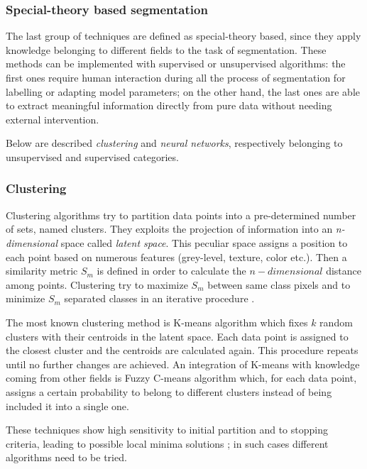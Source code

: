 \documentclass[../main.tex]{subfiles}
\begin{document}
\subsubsection{\large {Special-theory based segmentation}}

The last group of techniques are defined as special-theory based, since they apply knowledge belonging to different fields to the task of segmentation. 
These methods can be implemented with supervised or unsupervised algorithms: the first ones require human interaction during all the process of segmentation for labelling or adapting model parameters; on the other hand, the last ones are able to extract meaningful information directly from pure data without needing external intervention. 
 
Below are described \textit{clustering} and \textit{neural networks}, respectively belonging to unsupervised and supervised categories.


\subsubsection{{Clustering}}

Clustering algorithms try to partition data points into a pre-determined number of sets, named clusters.
They exploits the projection of information into an \textit{n-dimensional} space called \textit{latent space}\cite{automated_segm_tech}. 
This peculiar space assigns a position to each point based on numerous features (grey-level, texture, color etc.). 
Then a similarity metric $S_{m}$ is defined in order to calculate the $n-dimensional$ distance among points.
Clustering try to maximize $S_{m}$ between same class pixels and to minimize $S_{m}$ separated classes in an iterative procedure \cite{clustering}.

The most known clustering method is K-means algorithm \cite{k-means} which fixes $k$ random clusters with their centroids in the latent space.
Each data point is assigned to the closest cluster and the centroids are calculated again. 
This procedure repeats until no further changes are achieved.
An integration of K-means with knowledge coming from other fields is Fuzzy C-means algorithm \cite{fuzzy-c-means} which, for each data point, assigns a certain probability to belong to different clusters instead of being included it into a single one.

These techniques show high sensitivity to initial partition and to stopping criteria, leading to possible local minima solutions \cite{automated_segm_tech}; in such cases different algorithms need to be tried.
\end{document}
